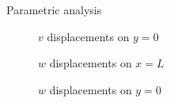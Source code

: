 \documentclass[aspectratio=169,xcolor=dvipsnames]{beamer}
\begin{document}
\begin{frame}{Parametric analysis}
\begin{figure}
\vspace{0.3 cm}
	\begin{minipage}{\linewidth}
	\begin{minipage}{0.05\linewidth}
	\end{minipage}\hfill
	\begin{minipage}{0.3\textwidth}
		\centering
		\tiny{$v$ displacements on $y=0$ }
	\end{minipage}
	\hfill
	\begin{minipage}{0.3\textwidth}
		\centering
\tiny{$w$ displacements on $x=L$ }
	\end{minipage}
	\hfill
	\begin{minipage}{0.3\textwidth}
		\centering
\tiny{$w$ displacements on $y=0$ }
	\end{minipage}	\hfill
\end{minipage}
\end{figure}

\end{frame}
\end{document}
